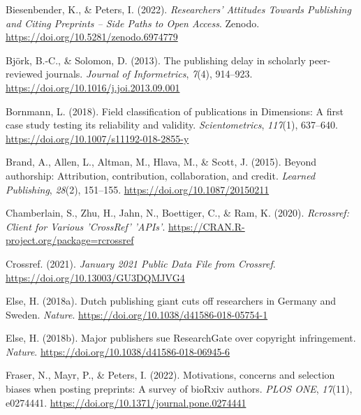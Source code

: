 \documentclass[
]{article}
\newlength{\cslhangindent}
\newlength{\cslentryspacingunit} %
\newenvironment{CSLReferences}[2] %
 {%
  \setlength{\parindent}{0pt}
  \ifodd #1
  \let\oldpar\par
  \def\par{\hangindent=\cslhangindent\oldpar}
  \fi
  \setlength{\parskip}{#2\cslentryspacingunit}
 }%
 {}
\begin{document}
\hypertarget{refs}{}
\begin{CSLReferences}{1}{0}
\leavevmode{}%
Biesenbender, K., \& Peters, I. (2022). \emph{{Researchers' Attitudes Towards Publishing and Citing Preprints -- Side Paths to Open Access}}. Zenodo. \url{https://doi.org/10.5281/zenodo.6974779}

\leavevmode{}%
Björk, B.-C., \& Solomon, D. (2013). The publishing delay in scholarly peer-reviewed journals. \emph{Journal of Informetrics}, \emph{7}(4), 914--923. \url{https://doi.org/10.1016/j.joi.2013.09.001}

\leavevmode{}%
Bornmann, L. (2018). Field classification of publications in {Dimensions}: A first case study testing its reliability and validity. \emph{Scientometrics}, \emph{117}(1), 637--640. \url{https://doi.org/10.1007/s11192-018-2855-y}

\leavevmode{}%
Brand, A., Allen, L., Altman, M., Hlava, M., \& Scott, J. (2015). Beyond authorship: Attribution, contribution, collaboration, and credit. \emph{Learned Publishing}, \emph{28}(2), 151--155. \url{https://doi.org/10.1087/20150211}

\leavevmode{}%
Chamberlain, S., Zhu, H., Jahn, N., Boettiger, C., \& Ram, K. (2020). \emph{Rcrossref: {Client} for {Various} '{CrossRef}' '{APIs}'}. \url{https://CRAN.R-project.org/package=rcrossref}

\leavevmode{}%
Crossref. (2021). \emph{January 2021 {Public} {Data} {File} from {Crossref}}. \url{https://doi.org/10.13003/GU3DQMJVG4}

\leavevmode{}%
Else, H. (2018a). Dutch publishing giant cuts off researchers in {Germany} and {Sweden}. \emph{Nature}. \url{https://doi.org/10.1038/d41586-018-05754-1}

\leavevmode{}%
Else, H. (2018b). Major publishers sue {ResearchGate} over copyright infringement. \emph{Nature}. \url{https://doi.org/10.1038/d41586-018-06945-6}

\leavevmode{}%
Fraser, N., Mayr, P., \& Peters, I. (2022). Motivations, concerns and selection biases when posting preprints: {A} survey of {bioRxiv} authors. \emph{PLOS ONE}, \emph{17}(11), e0274441. \url{https://doi.org/10.1371/journal.pone.0274441}


\end{CSLReferences}
\end{document}
